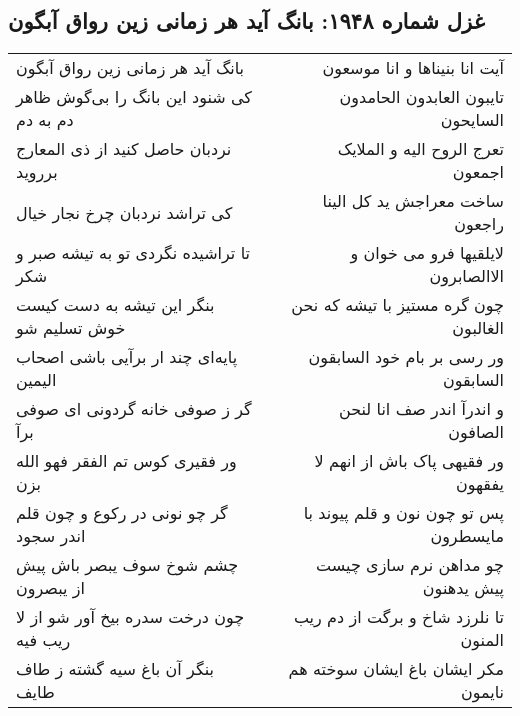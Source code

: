 \begin{center}
\section*{غزل شماره ۱۹۴۸: بانگ آید هر زمانی زین رواق آبگون}
\label{sec:1948}
\begin{longtable}{l p{0.5cm} r}
بانگ آید هر زمانی زین رواق آبگون
&&
آیت انا بنیناها و انا موسعون
\\
کی شنود این بانگ را بی‌گوش ظاهر دم به دم
&&
تایبون العابدون الحامدون السایحون
\\
نردبان حاصل کنید از ذی المعارج برروید
&&
تعرج الروح الیه و الملایک اجمعون
\\
کی تراشد نردبان چرخ نجار خیال
&&
ساخت معراجش ید کل الینا راجعون
\\
تا تراشیده نگردی تو به تیشه صبر و شکر
&&
لایلقیها فرو می خوان و الاالصابرون
\\
بنگر این تیشه به دست کیست خوش تسلیم شو
&&
چون گره مستیز با تیشه که نحن الغالبون
\\
پایه‌ای چند ار برآیی باشی اصحاب الیمین
&&
ور رسی بر بام خود السابقون السابقون
\\
گر ز صوفی خانه گردونی ای صوفی برآ
&&
و اندرآ اندر صف انا لنحن الصافون
\\
ور فقیری کوس تم الفقر فهو الله بزن
&&
ور فقیهی پاک باش از انهم لا یفقهون
\\
گر چو نونی در رکوع و چون قلم اندر سجود
&&
پس تو چون نون و قلم پیوند با مایسطرون
\\
چشم شوخ سوف یبصر باش پیش از یبصرون
&&
چو مداهن نرم سازی چیست پیش یدهنون
\\
چون درخت سدره بیخ آور شو از لا ریب فیه
&&
تا نلرزد شاخ و برگت از دم ریب المنون
\\
بنگر آن باغ سیه گشته ز طاف طایف
&&
مکر ایشان باغ ایشان سوخته هم نایمون
\\
\end{longtable}
\end{center}
